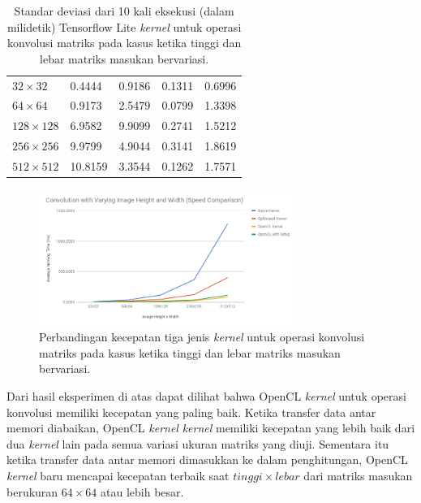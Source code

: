\begin{table}
	\centering
	\caption{Standar deviasi dari 10 kali eksekusi (dalam milidetik) Tensorflow Lite \textit{kernel} untuk operasi konvolusi matriks pada kasus ketika tinggi dan lebar matriks masukan bervariasi.}
	\label{tab:convvarhwdev}
\begin{tabular}{|>{\small}R{2.5cm}|>{\small}R{2.1cm}|>{\small}R{2.1cm}|>{\small}R{2.1cm}|>{\small}R{2.4cm}|}
	\hline
	 & 
	 & 
	 & 
	 & 
	 \\
	\hline
		$32 \times 32$ & 0.4444 & 0.9186 & 0.1311 & 0.6996
		\\
		\hline
		$64 \times 64$ & 0.9173 & 2.5479 & 0.0799 & 1.3398
		\\
		\hline
		$128 \times 128$ & 6.9582 & 9.9099 & 0.2741 & 1.5212
		\\
		\hline
		$256 \times 256$ & 9.9799 & 4.9044 & 0.3141 & 1.8619
		\\
		\hline
		$512 \times 512$ & 10.8159 & 3.3544 & 0.1262 & 1.7571
		\\
		\hline
	\end{tabular}
\end{table}

\begin{figure}
	\centering
	\includegraphics[width=0.75\textwidth]
	{pics/convvarhw.png}
	\caption{Perbandingan kecepatan tiga jenis \textit{kernel} untuk operasi konvolusi matriks pada kasus ketika tinggi dan lebar matriks masukan bervariasi.}
	\label{fig:convvarhw}
\end{figure}

Dari hasil eksperimen di atas dapat dilihat bahwa OpenCL \textit{kernel} untuk operasi konvolusi memiliki kecepatan yang paling baik. Ketika transfer data antar memori diabaikan, OpenCL \textit{kernel} \textit{kernel} memiliki kecepatan yang lebih baik dari dua \textit{kernel} lain pada semua variasi ukuran matriks yang diuji. Sementara itu ketika transfer data antar memori dimasukkan ke dalam penghitungan, OpenCL \textit{kernel} baru mencapai kecepatan terbaik saat $tinggi \times lebar$ dari matriks masukan berukuran $64 \times 64$ atau lebih besar.

